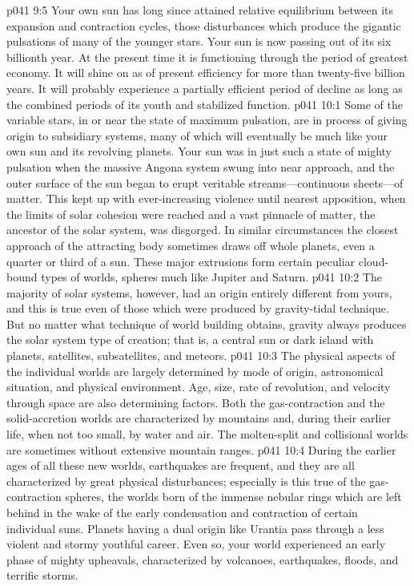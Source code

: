 \vs p041 9:5 Your own sun has long since attained relative equilibrium between its expansion and contraction cycles, those disturbances which produce the gigantic pulsations of many of the younger stars. Your sun is now passing out of its six billionth year. At the present time it is functioning through the period of greatest economy. It will shine on as of present efficiency for more than twenty\hyp{}five billion years. It will probably experience a partially efficient period of decline as long as the combined periods of its youth and stabilized function.\plusone
{}
\vs p041 10:1 Some of the variable stars, in or near the state of maximum pulsation, are in process of giving origin to subsidiary systems, many of which will eventually be much like your own sun and its revolving planets. Your sun was in just such a state of mighty pulsation when the massive Angona system swung into near approach, and the outer surface of the sun began to erupt veritable streams---continuous sheets---of matter. This kept up with ever\hyp{}increasing violence until nearest apposition, when the limits of solar cohesion were reached and a vast pinnacle of matter, the ancestor of the solar system, was disgorged. In similar circumstances the closest approach of the attracting body sometimes draws off whole planets, even a quarter or third of a sun. These major extrusions form certain peculiar cloud\hyp{}bound types of worlds, spheres much like Jupiter and Saturn.
\vs p041 10:2 The majority of solar systems, however, had an origin entirely different from yours, and this is true even of those which were produced by gravity\hyp{}tidal technique. But no matter what technique of world building obtains, gravity always produces the solar system type of creation; that is, a central sun or dark island with planets, satellites, subsatellites, and meteors.
\pc \vs p041 10:3 The physical aspects of the individual worlds are largely determined by mode of origin, astronomical situation, and physical environment. Age, size, rate of revolution, and velocity through space are also determining factors. Both the gas\hyp{}contraction and the solid\hyp{}accretion worlds are characterized by mountains and, during their earlier life, when not too small, by water and air. The molten\hyp{}split and collisional worlds are sometimes without extensive mountain ranges.
\vs p041 10:4 During the earlier ages of all these new worlds, earthquakes are frequent, and they are all characterized by great physical disturbances; especially is this true of the gas\hyp{}contraction spheres, the worlds born of the immense nebular rings which are left behind in the wake of the early condensation and contraction of certain individual suns. Planets having a dual origin like Urantia pass through a less violent and stormy youthful career. Even so, your world experienced an early phase of mighty upheavals, characterized by volcanoes, earthquakes, floods, and terrific storms.
